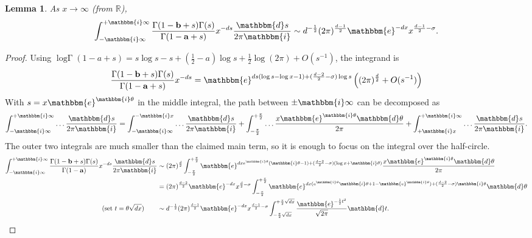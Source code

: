 \documentclass[12pt]{article}
\newcommand{\ee}[0] {\mathbbm{e}}
\newcommand{\ii}[0] {\mathbbm{i}}
\newcommand{\dd}[0] {\mathbbm{d}}
\newcommand{\logG} {\operatorname {log \Gamma}}
\numberwithin{equation}{section}
\newtheorem{lemma}[theorem]{Lemma}
\newcommand{\bfa}[0] {\mathbf{a}}
\newcommand{\bfb}[0] {\mathbf{b}}
\begin{document}
\begin{lemma}
\label{lamma_minimal_asmp}
As $x \to \infty$ (from $\mathbb{R}$),
\begin{equation*}
\int_{-\ii \infty}^{+\ii \infty} \frac{\Gamma(1-\bfb + s) \Gamma(s)}{\Gamma(1-\bfa+s)} x^{-d s} \frac{\dd s}{2\pi \ii} \sim d^{-\frac{1}{2}}(2\pi)^{\frac{d-1}{2}} \ee^{-d x} x^{\frac{d-1}{2} - \sigma}\text{.}
\end{equation*}
\end{lemma}
\begin{proof}
Using $\logG (1-a+s) = s \log s - s + (\tfrac{1}{2}-a) \log s + \frac{1}{2} \log(2\pi) + O(s^{-1})$, the integrand is
\begin{equation*}
\frac{\Gamma(1-\bfb + s) \Gamma(s)}{\Gamma(1-\bfa+s)} x^{-d s} = \ee^{d s (\log s - \log x-1) + (\frac{d-2}{2}-\sigma) \log s} \left( (2\pi)^{\frac{d}{2}} + O(s^{-1}) \right)
\end{equation*}
With $s = x \ee^{\ii \theta}$ in the middle integral, the path between $\pm \ii \infty$ can be decomposed as
\begin{equation*}
\int_{-\ii \infty}^{+\ii \infty} \dots \frac{\dd s}{2\pi \ii} = \int_{-\ii \infty}^{- \ii x} \dots \frac{\dd s}{2\pi \ii} + \int_{-\frac{\pi}{2}}^{+\frac{\pi}{2}} \dots \frac{x \ee^{\ii \theta} \dd \theta}{2\pi} + \int_{+\ii x}^{+\ii \infty} \dots \frac{\dd s}{2\pi \ii}\text{.}
\end{equation*}
The outer two integrals are much smaller than the claimed main term, so it is enough to focus on the integral over the half-circle.
\begin{align*}
\int_{-\ii \infty}^{+\ii \infty} \frac{\Gamma(1-\bfb + s) \Gamma(s)}{\Gamma(1-\bfa)} x^{-d s} \frac{\dd s}{2\pi \ii} & \sim (2\pi)^{\frac{d}{2}} \int_{-\frac{\pi}{2}}^{+\frac{\pi}{2}} \ee^{d x e^{\ii \theta} (\ii \theta-1) + (\frac{d-2}{2}-\sigma)(\log x + \ii \theta)} \frac{x \ee^{\ii \theta} \dd \theta}{2\pi}\\
& = (2\pi)^{\frac{d-2}{2}} \ee^{-d x} x^{\frac{d}{2} -\sigma} \int_{-\frac{\pi}{2}}^{+\frac{\pi}{2}} \ee^{d x (e^{\ii \theta} \ii \theta + 1-\ee^{\ii \theta}) + (\frac{d-2}{2}-\sigma) \ii \theta} \dd \theta\\
(\text{set } t = \theta \sqrt{dx} ) \quad \quad & \sim d^{-\frac{1}{2}} (2\pi)^{\frac{d-1}{2}} \ee^{-d x} x^{\frac{d-1}{2} -\sigma} \int_{-\frac{\pi}{2}\sqrt{dx}}^{+\frac{\pi}{2}\sqrt{dx}} \frac{\ee^{-\frac12 t^2}}{\sqrt{2\pi}} \dd t\text{.}
\end{align*}
\end{proof}
\end{document}
